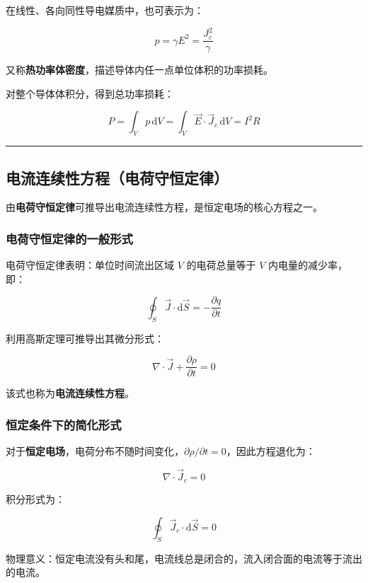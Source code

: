 在线性、各向同性导电媒质中，也可表示为：
\begin{formulaBox}
\[
p = \gamma E^2 = \frac{J_c^2}{\gamma}
\]
\end{formulaBox}
又称\textbf{热功率体密度}，描述导体内任一点单位体积的功率损耗。

\noindent 对整个导体体积分，得到总功率损耗：
\begin{formulaBox}
\[
P = \int_V p \,\mathrm{d}V = \int_V \vec{E} \cdot \vec{J}_c \,\mathrm{d}V = I^2 R
\]
\end{formulaBox}

\vspace{0.8cm}\hrule\vspace{0.8cm}

\subsection{电流连续性方程（电荷守恒定律）}
由\textbf{电荷守恒定律}可推导出电流连续性方程，是恒定电场的核心方程之一。

\subsubsection{电荷守恒定律的一般形式}
电荷守恒定律表明：单位时间流出区域 $V$ 的电荷总量等于 $V$ 内电量的减少率，即：
\begin{formulaBox}
\[
\oint_S \vec{J} \cdot \mathrm{d}\vec{S} = -\frac{\partial q}{\partial t}
\]
\end{formulaBox}

\noindent 利用高斯定理可推导出其微分形式：
\begin{formulaBox}
\[
\nabla \cdot \vec{J} + \frac{\partial \rho}{\partial t} = 0
\]
\end{formulaBox}
该式也称为\textbf{电流连续性方程}。

\subsubsection{恒定条件下的简化形式}
对于\textbf{恒定电场}，电荷分布不随时间变化，$\partial \rho/\partial t = 0$，因此方程退化为：
\begin{formulaBox}
\[
\nabla \cdot \vec{J}_c = 0
\]
\end{formulaBox}
积分形式为：
\begin{formulaBox}
\[
\oint_S \vec{J}_c \cdot \mathrm{d}\vec{S} = 0
\]
\end{formulaBox}
物理意义：恒定电流没有头和尾，电流线总是闭合的，流入闭合面的电流等于流出的电流。

